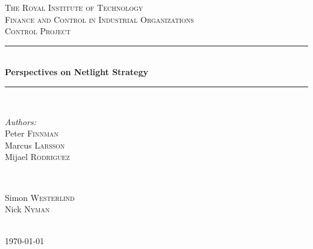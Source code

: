 \documentclass[12pt]{article}
\begin{document}
\begin{titlepage}

\newcommand{\HRule}{\rule{\linewidth}{0.5mm}} %

\center %

\textsc{\LARGE The Royal Institute of Technology}\\[1.5cm] %
\textsc{\Large Finance and Control in Industrial Organizations}\\[0.5cm] 
\textsc{\large Control Project}\\[0.5cm] 

\HRule \\[0.4cm]
{ \huge \bfseries Perspectives on Netlight Strategy}\\[0.4cm] %
\HRule \\[1.5cm]

\begin{minipage}{0.4\textwidth}
\begin{flushleft} \large
\emph{Authors:}\\
Peter \textsc{Finnman} \\%
Marcus \textsc{Larsson} \\

Mijael \textsc{Rodriguez}
\end{flushleft}
\end{minipage}
~
\begin{minipage}{0.4\textwidth}
\begin{flushright} \large
Simon \textsc{Westerlind} \\
Nick \textsc{Nyman} 
\end{flushright}
\end{minipage}\\[2cm]

{\large \today}\\[2cm] %


\end{titlepage}
\end{document}

